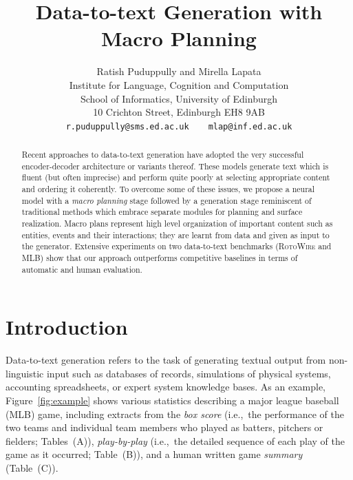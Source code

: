 \documentclass[11pt,a4paper]{article}
\title{Data-to-text Generation with Macro Planning}
\author{Ratish Puduppully  \textnormal{and} Mirella Lapata\\
Institute for Language, Cognition and Computation\\
School of Informatics, University of Edinburgh\\
 10 Crichton Street, Edinburgh EH8 9AB\\
\texttt{r.puduppully@sms.ed.ac.uk}~~~~\texttt{mlap@inf.ed.ac.uk}\\
}
\date{}
\begin{document}
\maketitle
\begin{abstract}
  Recent approaches to data-to-text generation have adopted the very
  successful encoder-decoder architecture or variants thereof.  These
  models generate text which is fluent (but often imprecise) and
  perform quite poorly at selecting appropriate content and ordering
  it coherently.  To overcome some of these issues, we propose a
  neural model with a \emph{macro planning} stage followed by a
  generation stage 
  reminiscent of traditional methods which embrace
  separate modules for planning and surface realization. 
Macro plans
  represent high level organization of important content such as
  entities, events and their interactions; 
 they are learnt
  from data
  and given as input to the generator.
Extensive experiments on two data-to-text benchmarks
  (\textsc{RotoWire} and MLB) show that our approach outperforms
  competitive baselines in terms of automatic and human evaluation.
\end{abstract}

\section{Introduction}

Data-to-text generation refers to the task of generating textual
output from non-linguistic input
\cite{Reiter:1997:BAN:974487.974490,reiter-dale:00,
  DBLP:journals/jair/GattK18} such as databases of records,
simulations of physical systems, accounting spreadsheets, or expert
system knowledge bases. As an example, Figure~\ref{fig:example} shows
various statistics describing a major league baseball (MLB) game,
including extracts from the \emph{box score} (i.e.,~the performance of
the two teams and individual team members who played as batters,
pitchers or fielders; Tables~(A)), \emph{play-by-play} (i.e.,~the
detailed sequence of each play of the game as it occurred; Table~(B)),
and a human written game \emph{summary} (Table~(C)).
\end{document}
